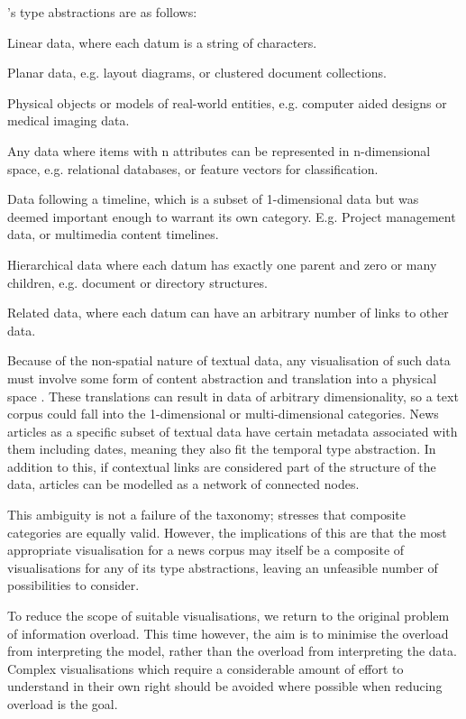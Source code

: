 \citeauthor{TheEyesHaveIt}'s type abstractions are as follows:
\begin{description}[leftmargin=11em,style=nextline]
	\item [1-dimensional] Linear data, where each datum is a string of characters.
	\item[2-dimensional] Planar data, e.g. layout diagrams, or clustered document collections.
	\item[3-dimensional] Physical objects or models of real-world entities, e.g. computer aided designs or medical imaging data.
	\item[Multi-dimensional] Any data where items with n attributes can be represented in n-dimensional space, e.g. relational databases, or feature vectors for classification.
	\item[Temporal] Data following a timeline, which is a subset of 1-dimensional data but was deemed important enough to warrant its own category. E.g. Project management data, or multimedia content timelines.
	\item[Tree] Hierarchical data where each datum has exactly one parent and zero or many children, e.g. document or directory structures.
	\item[Network] Related data, where each datum can have an arbitrary number of links to other data.
\end{description}

Because of the non-spatial nature of textual data, any visualisation of such data must involve some form of content abstraction and translation into a physical space \citep{VisualizingTheNonVisual}. These translations can result in data of arbitrary dimensionality, so a text corpus could fall into the 1-dimensional or multi-dimensional categories. News articles as a specific subset of textual data have certain metadata associated with them including dates, meaning they also fit the temporal type abstraction. In addition to this, if contextual links are considered part of the structure of the data, articles can be modelled as a network of connected nodes.

This ambiguity is not a failure of the taxonomy; \citeauthor{TheEyesHaveIt} stresses that composite categories are equally valid. However, the implications of this are that the most appropriate visualisation for a news corpus may itself be a composite of visualisations for any of its type abstractions, leaving an unfeasible number of possibilities to consider. 

To reduce the scope of suitable visualisations, we return to the original problem of information overload. This time however, the aim is to minimise the overload from interpreting the model, rather than the overload from interpreting the data. Complex visualisations which require a considerable amount of effort to understand in their own right should be avoided where possible when reducing overload is the goal.

